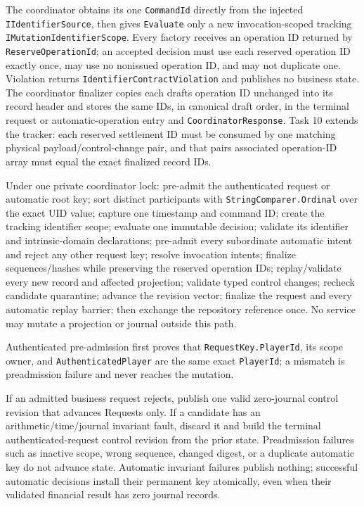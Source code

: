 \documentclass[
  10pt,
  letterpaper,
]{article}
\newcommand{\passthrough}[1]{#1}
\begin{document}
The coordinator obtains its one \passthrough{\lstinline!CommandId!}
directly from the injected \passthrough{\lstinline!IIdentifierSource!},
then gives \passthrough{\lstinline!Evaluate!} only a new
invocation-scoped tracking \texttt{IMutationIdentifierScope}. Every
factory receives an operation ID returned by
\passthrough{\lstinline!ReserveOperationId!}; an accepted decision must
use each reserved operation ID exactly once, may use no nonissued
operation ID, and may not duplicate one. Violation returns
\texttt{IdentifierContractViolation} and publishes no business state.
The coordinator finalizer copies each draft\textquotesingle s operation
ID unchanged into its record header and stores the same IDs, in
canonical draft order, in the terminal request or automatic-operation
entry and \passthrough{\lstinline!CoordinatorResponse!}. Task 10 extends
the tracker: each reserved settlement ID must be consumed by one
matching physical payload/control-change pair, and that
pair\textquotesingle s associated operation-ID array must equal the
exact finalized record IDs.

Under one private coordinator lock: pre-admit the authenticated request
or automatic root key; sort distinct participants with
\passthrough{\lstinline!StringComparer.Ordinal!} over the exact UID
value; capture one timestamp and command ID; create the tracking
identifier scope; evaluate one immutable decision; validate its
identifier and intrinsic-domain declarations; pre-admit every
subordinate automatic intent and reject any other request key; resolve
invocation intents; finalize sequences/hashes while preserving the
reserved operation IDs; replay/validate every new record and affected
projection; validate typed control changes; recheck candidate
quarantine; advance the revision vector; finalize the request and every
automatic replay barrier; then exchange the repository reference once.
No service may mutate a projection or journal outside this path.

Authenticated pre-admission first proves that
\passthrough{\lstinline!RequestKey.PlayerId!}, its scope owner, and
\passthrough{\lstinline!AuthenticatedPlayer!} are the same exact
\passthrough{\lstinline!PlayerId!}; a mismatch is preadmission failure
and never reaches the mutation.

If an admitted business request rejects, publish one valid zero-journal
control revision that advances Requests only. If a candidate has an
arithmetic/\allowbreak{}time/\allowbreak{}journal invariant fault,
discard it and build the terminal authenticated-request control revision
from the prior state. Preadmission failures such as inactive scope,
wrong sequence, changed digest, or a duplicate automatic key do not
advance state. Automatic invariant failures publish nothing; successful
automatic decisions install their permanent key atomically, even when
their validated financial result has zero journal records.
\end{document}
